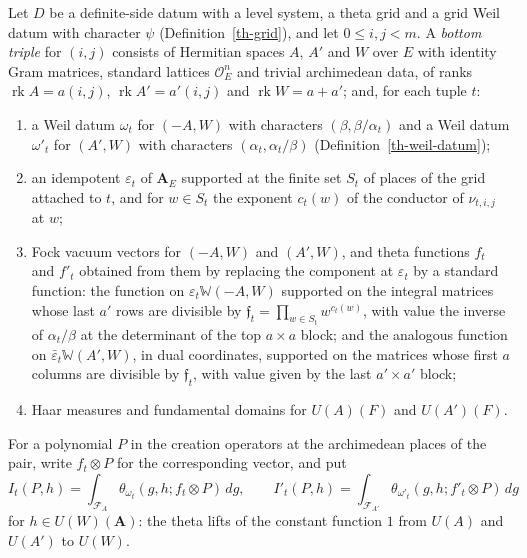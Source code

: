 \begin{definition}\label{th-bottom-triple}
Let $D$ be a definite-side datum with a level system, a theta grid and a grid
Weil datum with character $\psi$ (Definition~\ref{th-grid}), and let
$0\leq i,j<m$. A \emph{bottom triple} for $(i,j)$ consists of Hermitian spaces
$A$, $A'$ and $W$ over $E$ with identity Gram matrices, standard lattices
$\mathcal O_E^n$ and trivial archimedean data, of ranks
$\operatorname{rk}A=a(i,j)$, $\operatorname{rk}A'=a'(i,j)$ and
$\operatorname{rk}W=a+a'$; and, for each tuple $t$:
\begin{enumerate}
\item a Weil datum $\omega_t$ for $(-A,W)$ with characters
  $(\beta,\beta/\alpha_t)$ and a Weil datum $\omega'_t$ for $(A',W)$ with
  characters $(\alpha_t,\alpha_t/\beta)$ (Definition~\ref{th-weil-datum});
\item an idempotent $\varepsilon_t$ of $\mathbf A_E$ supported at the finite
  set $S_t$ of places of the grid attached to $t$, and for $w\in S_t$ the
  exponent $c_t(w)$ of the conductor of $\nu_{t,i,j}$ at $w$;
\item Fock vacuum vectors for $(-A,W)$ and $(A',W)$, and theta functions
  $f_t$ and $f'_t$ obtained from them by replacing the component at
  $\varepsilon_t$ by a standard function: the function on
  $\varepsilon_t\mathbb W(-A,W)$ supported on the integral matrices whose last
  $a'$ rows are divisible by $\mathfrak f_t=\prod_{w\in S_t}w^{c_t(w)}$, with
  value the inverse of $\alpha_t/\beta$ at the determinant of the top
  $a\times a$ block; and the analogous function on
  $\bar\varepsilon_t\mathbb W(A',W)$, in dual coordinates, supported on the
  matrices whose first $a$ columns are divisible by $\mathfrak f_t$, with value
  given by the last $a'\times a'$ block;
\item Haar measures and fundamental domains for $U(A)(F)$ and $U(A')(F)$.
\end{enumerate}
For a polynomial $P$ in the creation operators at the archimedean places of the
pair, write $f_t\otimes P$ for the corresponding vector, and put
\[
I_t(P,h)=\int_{\mathcal F_A}\theta_{\omega_t}(g,h;f_t\otimes P)\,dg,\qquad
I'_t(P,h)=\int_{\mathcal F_{A'}}\theta_{\omega'_t}(g,h;f'_t\otimes P)\,dg
\]
for $h\in U(W)(\mathbf A)$: the theta lifts of the constant function $1$ from
$U(A)$ and $U(A')$ to $U(W)$.
\end{definition}

